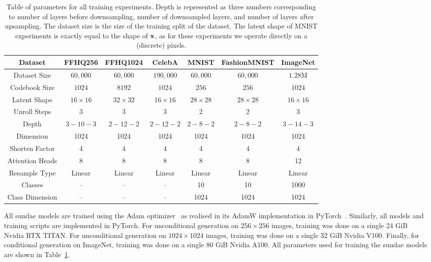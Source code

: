 \begin{table}[ht]
    \centering
    \begin{tabular}{|c||c c||c||c c||c||}
    \hline
    \textbf{Dataset} & \textbf{FFHQ256} & \textbf{FFHQ1024} & \textbf{CelebA}
                     & \textbf{MNIST} & \textbf{FashionMNIST} &
                     \textbf{ImageNet} \\
    \hline
    Dataset Size & $60,000$ & $60,000$ & $190,000$ & $60,000$ & $60,000$ & $1.28$M \\
    Codebook Size & $1024$ & $8192$ & $1024$ & $256$ & $256$ & $1024$ \\
    Latent Shape & $16 \times 16$ & $32 \times 32$ & $16 \times 16$ & $28 \times
                 28$ & $28 \times 28$ & $16 \times 16$ \\
    Unroll Steps & 3 & 3 & 3 & 2 & 2 & 3 \\
    \hline
    Depth & $3-10-3$ & $2-12-2$ & $2-12-2$ & $2-8-2$ & $2-8-2$ & $3-14-3$\\
    Dimension & 1024 & 1024 & 1024 & 1024 & 1024 & 1024 \\
    Shorten Factor & 4 & 4 & 4 & 4 & 4 & 4 \\
    Attention Heads & 8 & 8 & 8 & 8 & 8 & 12 \\
    Resample Type & Linear & Linear & Linear & Linear & Linear & Linear \\
    \hline
    Classes & -- & -- & -- & 10 & 10 & 1000 \\
    Class Dimension & -- & -- & -- & 1024 & 1024 & 1024 \\
    \hline
    \end{tabular}
    \caption{
        Table of parameters for all training experiments. Depth is
        represented as three numbers corresponding to number of layers before
        downsampling, number of downsampled layers, and number of layers after
        upsampling. The dataset size is the size of the training split of the
        dataset. The latent shape of MNIST experiments is exactly equal to the
        shape of $\mathbf{x}$, as for these experiments we operate directly on a
        (discrete) pixels.
    }
    \label{tab:parameters}
\end{table}

All \gls{sundae} models are trained using the Adam
optimizer~\cite{kingma2014adam} as realised in its AdamW implementation in
PyTorch~\cite{paszke2019pytorch}. Similarly, all models and training scripts are
implemented in PyTorch. For unconditional generation on $256 \times 256$ images,
training was done on a single 24 GiB Nvidia RTX TITAN. For unconditional
generation on $1024 \times 1024$ images, training was done on a single 32 GiB
Nvidia V100. Finally, for conditional generation on ImageNet, training was done
on a single 80 GiB Nvidia A100. All parameters used for training the
\gls{sundae} models are shown in Table~\ref{tab:parameters}.


